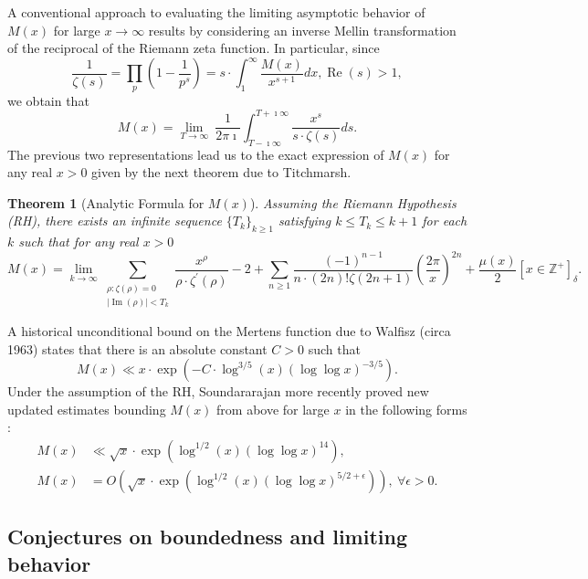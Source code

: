 \documentclass[11pt,reqno,a4letter]{article}
\numberwithin{figure}{section}
\numberwithin{table}{section}
\newcommand{\Iverson}[1]{\ensuremath{\left[#1\right]_{\delta}}}
\theoremstyle{plain}
\newtheorem{theorem}{Theorem}
\numberwithin{theorem}{section}
\theoremstyle{definition}
\renewcommand{\Re}{\operatorname{Re}}
\renewcommand{\Im}{\operatorname{Im}}
\begin{document}
A conventional approach to evaluating the limiting asymptotic 
behavior of $M(x)$ for large $x \rightarrow \infty$ results by considering an 
inverse Mellin transformation of the reciprocal of the Riemann zeta function. 
In particular, since 
\[
\frac{1}{\zeta(s)} = \prod_{p} \left(1 - \frac{1}{p^s}\right) = 
     s \cdot \int_1^{\infty} \frac{M(x)}{x^{s+1}} dx, \Re(s) > 1, 
\]
we obtain that 
\[
M(x) = \lim_{T \rightarrow \infty}\ \frac{1}{2\pi\imath} \int_{T-\imath\infty}^{T+\imath\infty} 
     \frac{x^s}{s \cdot \zeta(s)} ds. 
\] 
The previous two representations lead us to the 
exact expression of $M(x)$ for any real $x > 0$ 
given by the next theorem due to Titchmarsh. 
\nocite{TITCHMARSH} 

\begin{theorem}[Analytic Formula for $M(x)$] 
\label{theorem_MxMellinTransformInvFormula} 
Assuming the Riemann Hypothesis (RH), there exists an infinite sequence 
$\{T_k\}_{k \geq 1}$ satisfying $k \leq T_k \leq k+1$ for each $k$ 
such that for any real $x > 0$ 
\[
M(x) = \lim_{k \rightarrow \infty} 
     \sum_{\substack{\rho: \zeta(\rho) = 0 \\ |\Im(\rho)| < T_k}} 
     \frac{x^{\rho}}{\rho \cdot \zeta^{\prime}(\rho)} - 2 + 
     \sum_{n \geq 1} \frac{(-1)^{n-1}}{n \cdot (2n)! \zeta(2n+1)} 
     \left(\frac{2\pi}{x}\right)^{2n} + 
     \frac{\mu(x)}{2} \Iverson{x \in \mathbb{Z}^{+}}. 
\] 
\end{theorem} 

A historical unconditional bound on the Mertens function due to Walfisz (circa 1963) 
states that there is an absolute constant $C > 0$ such that 
$$M(x) \ll x \cdot \exp\left(-C \cdot \log^{3/5}(x) 
  (\log\log x)^{-3/5}\right).$$ 
Under the assumption of the RH, Soundararajan more recently proved new updated estimates 
bounding $M(x)$ from above for large $x$ in the following forms \cite{SOUND-MERTENS-ANNALS}: 
\begin{align*} 
M(x) & \ll \sqrt{x} \cdot \exp\left(\log^{1/2}(x) (\log\log x)^{14}\right), \\ 
M(x) & = O\left(\sqrt{x} \cdot \exp\left( 
     \log^{1/2}(x) (\log\log x)^{5/2+\epsilon}\right)\right),\ 
     \forall \epsilon > 0. 
\end{align*} 

\subsection{Conjectures on boundedness and limiting behavior} 
\end{document}
